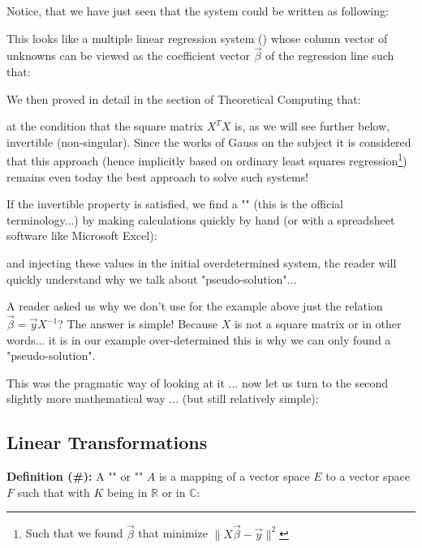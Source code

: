 	Notice, that we have just seen that the system could be written as following:
	
	This looks like a multiple linear regression system () whose column vector of unknowns can be viewed as the coefficient vector $\vec{\beta}$ of the regression line such that:
	
We then proved in detail in the section of Theoretical Computing that:
	

at the condition that the square matrix $X^TX$ is, as we will see further below, invertible (non-singular). Since the works of Gauss on the subject it is considered that this approach (hence implicitly based on ordinary least squares regression\footnote{Such that we found $\vec{\beta}$ that minimize $\|X\vec{\beta}-\vec{y}\|^2$}) remains even today the best approach to solve such systems!

	If the invertible property is satisfied, we find a "" (this is the official terminology...) by making calculations quickly by hand (or with a spreadsheet software like Microsoft Excel):
	
and injecting these values in the initial overdetermined system, the reader will quickly understand why we talk about "pseudo-solution"...

	\begin{tcolorbox}[title=Remark,colframe=black,arc=10pt]
A reader asked us why we don't use for the example above just the relation $\vec{\beta}=\vec{y}X^{-1}$? The answer is simple! Because $X$ is not a square matrix or in other words... it is in our example over-determined this is why we can only found a "pseudo-solution".
	\end{tcolorbox}

This was the pragmatic way of looking at it ... now let us turn to the second slightly more mathematical way ... (but still relatively simple):

	\subsection{Linear Transformations}
	\textbf{Definition (\#\mydef):} A "" or "" $A$ is a mapping of a vector space $E$ to a vector space $F$ such that with $K$ being in $\mathbb{R}$ or in $\mathbb{C}$\label{linear application}:
	

